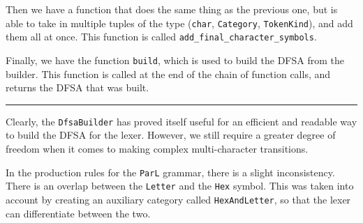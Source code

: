\documentclass{article}
\newcommand{\code}[1]{\texttt{#1}}
\begin{document}
\begin{figure}[H]
    \begin{subfigure}[t]{0.5\textwidth}
        \centering
    \end{subfigure}
    \begin{subfigure}[t]{0.5\textwidth}
        \centering
    \end{subfigure}
\end{figure}

Then we have a function that does the same thing as the previous one, but is
able to take in multiple tuples of the type (\code{char}, \code{Category},
\code{TokenKind}), and add them all at once. This function is called
\code{add\_final\_character\_symbols}.

Finally, we have the function \code{build}, which is used to build the DFSA from the builder. This function is called at the end of the chain of function calls, and returns the DFSA that was built.

\begin{center}
    \rule{0.5\textwidth}{0.4pt}
\end{center}

Clearly, the \code{DfsaBuilder} has proved itself useful for an efficient and
readable way to build the DFSA for the lexer. However, we still require a
greater degree of freedom when it comes to making complex multi-character
transitions.

\begin{warningbox}{}
    In the production rules for the \code{ParL} grammar, there is a slight
    inconsistency. There is an overlap between the \code{Letter} and the
    \code{Hex} symbol. This was taken into account by creating an auxiliary
    category called \code{HexAndLetter}, so that the lexer can differentiate
    between the two.
\end{warningbox}
\end{document}
